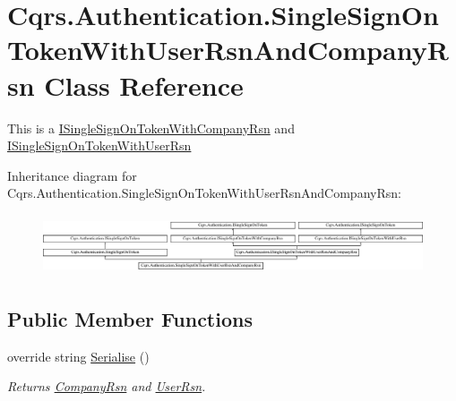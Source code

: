 \hypertarget{classCqrs_1_1Authentication_1_1SingleSignOnTokenWithUserRsnAndCompanyRsn}{}\section{Cqrs.\+Authentication.\+Single\+Sign\+On\+Token\+With\+User\+Rsn\+And\+Company\+Rsn Class Reference}
\label{classCqrs_1_1Authentication_1_1SingleSignOnTokenWithUserRsnAndCompanyRsn}


This is a \hyperlink{interfaceCqrs_1_1Authentication_1_1ISingleSignOnTokenWithCompanyRsn}{I\+Single\+Sign\+On\+Token\+With\+Company\+Rsn} and \hyperlink{interfaceCqrs_1_1Authentication_1_1ISingleSignOnTokenWithUserRsn}{I\+Single\+Sign\+On\+Token\+With\+User\+Rsn}  


Inheritance diagram for Cqrs.\+Authentication.\+Single\+Sign\+On\+Token\+With\+User\+Rsn\+And\+Company\+Rsn\+:\begin{figure}[H]
\begin{center}
\leavevmode
\includegraphics[height=1.794872cm]{classCqrs_1_1Authentication_1_1SingleSignOnTokenWithUserRsnAndCompanyRsn}
\end{center}
\end{figure}
\subsection*{Public Member Functions}
\begin{DoxyCompactItemize}
\item 
override string \hyperlink{classCqrs_1_1Authentication_1_1SingleSignOnTokenWithUserRsnAndCompanyRsn_a8d44249c00e5264dc7b37f4868836a80_a8d44249c00e5264dc7b37f4868836a80}{Serialise} ()
\begin{DoxyCompactList}\small\item\em Returns \hyperlink{classCqrs_1_1Authentication_1_1SingleSignOnTokenWithUserRsnAndCompanyRsn_ae81ee4a4935b762a1ed2504ea321c517_ae81ee4a4935b762a1ed2504ea321c517}{Company\+Rsn} and \hyperlink{classCqrs_1_1Authentication_1_1SingleSignOnTokenWithUserRsnAndCompanyRsn_a4963f5699921952ac8b6439d5308090d_a4963f5699921952ac8b6439d5308090d}{User\+Rsn}. \end{DoxyCompactList}\end{DoxyCompactItemize}
